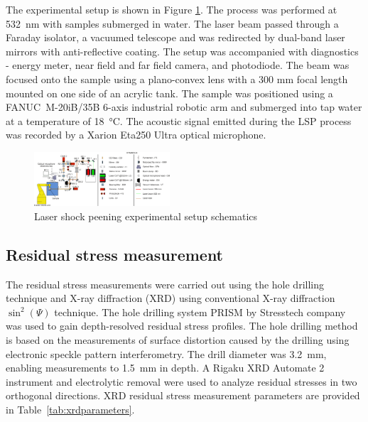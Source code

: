     The experimental setup is shown in Figure \ref{fig:optical_setup}. The process was performed at \SI{532}{\nano\meter} with samples submerged in water. The laser beam passed through a Faraday isolator, a vacuumed telescope and was redirected by dual-band laser mirrors with anti-reflective coating. The setup was accompanied with diagnostics - energy meter, near field and far field camera, and photodiode. The beam was focused onto the sample using a plano-convex lens with a 300 mm focal length mounted on one side of an acrylic tank. The sample was positioned using a FANUC~M-20iB/35B 6-axis industrial robotic arm and submerged into tap water at a temperature of \SI{18}{\celsius}. The acoustic signal emitted during the LSP process was recorded by a Xarion Eta250 Ultra optical microphone.



        \begin{figure}[h]      
        \includegraphics[width=0.45\textwidth]{img/optical setup.png}

        \caption{Laser shock peening experimental setup schematics}
        \label{fig:optical_setup}
        \end{figure}


\subsection{Residual stress measurement}

The residual stress measurements were carried out using the hole drilling technique  and X-ray diffraction (XRD) using conventional X-ray diffraction \(\sin ^2(\Psi )\) technique. The hole drilling system PRISM by Stresstech company was used to gain depth-resolved residual stress profiles. The hole drilling method is based on the measurements of surface distortion caused by the drilling using electronic speckle pattern interferometry. The drill diameter was \SI{3.2}{\mm}, enabling measurements to \SI{1.5}{\mm} in depth.  A Rigaku XRD Automate 2 instrument and electrolytic removal were used to analyze residual stresses in two orthogonal directions. XRD residual stress measurement parameters are provided in Table~\ref{tab:xrdparameters}.


